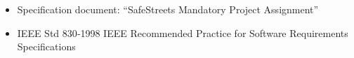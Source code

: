 \begin{itemize}
    \item Specification document: “SafeStreets Mandatory Project Assignment”
    \item IEEE Std 830‐1998 IEEE Recommended Practice for Software Requirements Specifications 
\end{itemize}